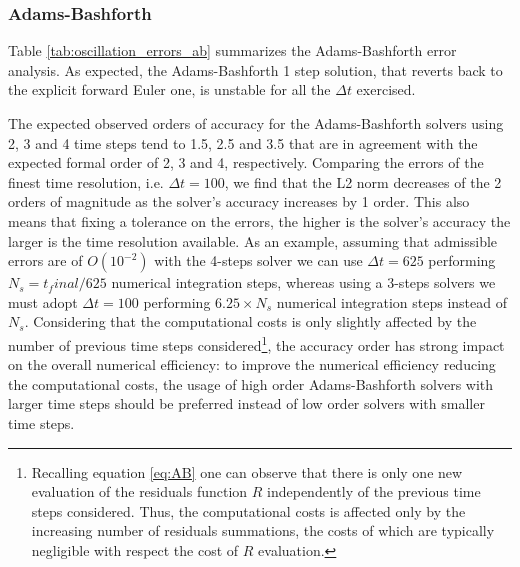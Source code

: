 \subsubsection{Adams-Bashforth}

Table \ref{tab:oscillation_errors_ab} summarizes the Adams-Bashforth error analysis. As expected, the Adams-Bashforth 1 step solution, that reverts back to the explicit forward Euler one, is unstable for all the $\Delta t$ exercised.

The expected observed orders of accuracy for the Adams-Bashforth solvers using 2, 3 and 4 time steps tend to 1.5, 2.5 and 3.5 that are in agreement with the expected formal order of 2, 3 and 4, respectively. Comparing the errors of the finest time resolution, i.e. $\Delta t=100$, we find that the L2 norm decreases of the 2 orders of magnitude as the solver's accuracy increases by 1 order. This also means that fixing a tolerance on the errors, the higher is the solver's accuracy the larger is the time resolution available. As an example, assuming that admissible errors are of $O(10^{-2})$ with the 4-steps solver we can use $\Delta t=625$ performing $N_s=t_final/625$ numerical integration steps, whereas using a 3-steps solvers we must adopt $\Delta t=100$ performing $6.25 \times N_s$ numerical integration steps instead of $N_s$. Considering that the computational costs is only slightly affected by the number of previous time steps considered\footnote{Recalling equation \ref{eq:AB} one can observe that there is only one new evaluation of the residuals function $R$ independently of the previous time steps considered. Thus, the computational costs is affected only by the increasing number of residuals summations, the costs of which are typically negligible with respect the cost of $R$ evaluation.}, the accuracy order has strong impact on the overall numerical efficiency: to improve the numerical efficiency reducing the computational costs, the usage of high order Adams-Bashforth solvers with larger time steps should be preferred instead of low order solvers with smaller time steps.

